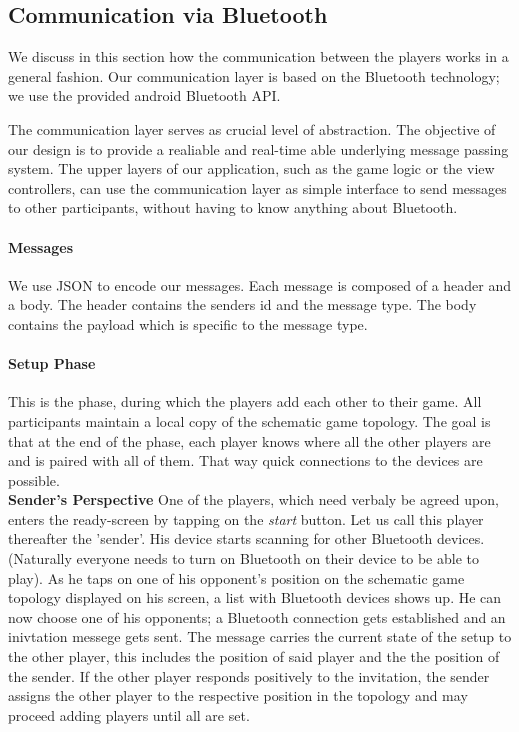 \documentclass{report}
\begin{document}
\subsection{Communication via Bluetooth} We discuss in this section how the communication between the players works in a general fashion. Our communication layer is based on the Bluetooth technology; we use the provided android Bluetooth API. 

The communication layer serves as crucial level of abstraction. The objective of our design is to provide a realiable and real-time able underlying message passing system. The upper layers of our application, such as the game logic or the view controllers, can use the communication layer as simple interface to send messages to other participants, without having to know anything about Bluetooth.

\paragraph{Messages}
We use JSON to encode our messages. Each message is composed of a header and a body. The header contains the senders id and the message type. The body contains the payload which is specific to the message type.

\paragraph{Setup Phase}
This is the phase, during which the players add each other to their game. All participants maintain a local copy of the schematic game topology. The goal is that at the end of the phase, each player knows where all the other players are and is paired with all of them. That way quick connections to the devices are possible.\\

\textbf{Sender's Perspective} One of the players, which need verbaly be agreed upon, enters the ready-screen by tapping on the \textit{start} button. Let us call this player thereafter the 'sender'. His device starts scanning for other Bluetooth devices. (Naturally everyone needs to turn on Bluetooth on their device to be able to play). As he taps on one of his opponent's position on the schematic game topology displayed on his screen, a list with Bluetooth devices shows up. He can now choose one of his opponents; a Bluetooth connection gets established and an inivtation messege gets sent. The message carries the current state of the setup to the other player, this includes the position of said player and the the position of the sender. If the other player responds positively to the invitation, the sender assigns the other player to the respective position in the topology and may proceed adding players until all are set.\\
\end{document}
